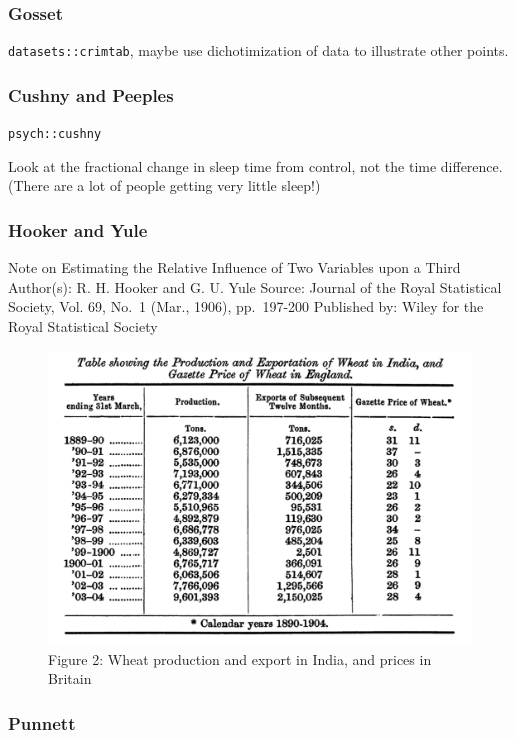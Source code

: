 \documentclass[]{book}
\begin{document}
\hypertarget{gosset}{%
\subsubsection{Gosset}\label{gosset}}

\texttt{datasets::crimtab}, maybe use dichotimization of data to illustrate other points.

\hypertarget{cushny-and-peeples}{%
\subsubsection{Cushny and Peeples}\label{cushny-and-peeples}}

\texttt{psych::cushny}

Look at the fractional change in sleep time from control, not the time difference. (There are a lot of people getting very little sleep!)

\hypertarget{hooker-and-yule}{%
\subsubsection{Hooker and Yule}\label{hooker-and-yule}}

Note on Estimating the Relative Influence of Two Variables upon a Third
Author(s): R. H. Hooker and G. U. Yule
Source: Journal of the Royal Statistical Society, Vol. 69, No.~1 (Mar., 1906), pp.~197-200 Published by: Wiley for the Royal Statistical Society

\begin{figure}\includegraphics[width=0.8\linewidth]{images/india-exports-yule} \caption{Figure 2: Wheat production and export in India, and prices in Britain}\label{yule-exports}
\end{figure}

\hypertarget{punnett}{%
\subsubsection{Punnett}\label{punnett}}
\end{document}
